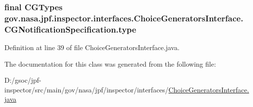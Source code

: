\subsubsection[{\texorpdfstring{type}{type}}]{\setlength{\rightskip}{0pt plus 5cm}final {\bf C\+G\+Types} gov.\+nasa.\+jpf.\+inspector.\+interfaces.\+Choice\+Generators\+Interface.\+C\+G\+Notification\+Specification.\+type\hspace{0.3cm}{\ttfamily [private]}}\hypertarget{classgov_1_1nasa_1_1jpf_1_1inspector_1_1interfaces_1_1_choice_generators_interface_1_1_c_g_notification_specification_abcfbe6c938f6c42eb46d8511d21c3178}{}\label{classgov_1_1nasa_1_1jpf_1_1inspector_1_1interfaces_1_1_choice_generators_interface_1_1_c_g_notification_specification_abcfbe6c938f6c42eb46d8511d21c3178}


Definition at line 39 of file Choice\+Generators\+Interface.\+java.



The documentation for this class was generated from the following file\+:\begin{DoxyCompactItemize}
\item 
D\+:/gsoc/jpf-\/inspector/src/main/gov/nasa/jpf/inspector/interfaces/\hyperlink{_choice_generators_interface_8java}{Choice\+Generators\+Interface.\+java}\end{DoxyCompactItemize}
